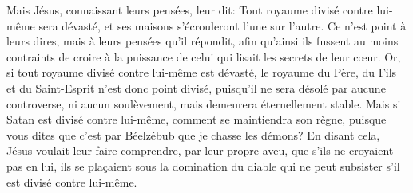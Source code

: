 Mais Jésus, connaissant leurs pensées, leur dit:
	Tout royaume divisé contre lui-même sera dévasté,
	et ses maisons s’écrouleront l’une sur l’autre.
Ce n’est point à leurs dires, mais à leurs pensées qu’il répondit,
	afin qu’ainsi ils fussent au moins contraints
	de croire à la puissance de celui qui lisait les secrets de leur cœur.
Or, si tout royaume divisé contre lui-même est dévasté,
	le royaume du Père, du Fils et du Saint-Esprit n’est donc point divisé,
	puisqu’il ne sera désolé par aucune controverse, ni aucun soulèvement,
	mais demeurera éternellement stable.
Mais si Satan est divisé contre lui-même, comment se maintiendra son règne,
	puisque vous dites que c’est par Béelzébub que je chasse les démons?
En disant cela, Jésus voulait leur faire comprendre, par leur propre aveu,
	que s’ils ne croyaient pas en lui,
	ils se plaçaient sous la domination du diable
	qui ne peut subsister s’il est divisé contre lui-même.
